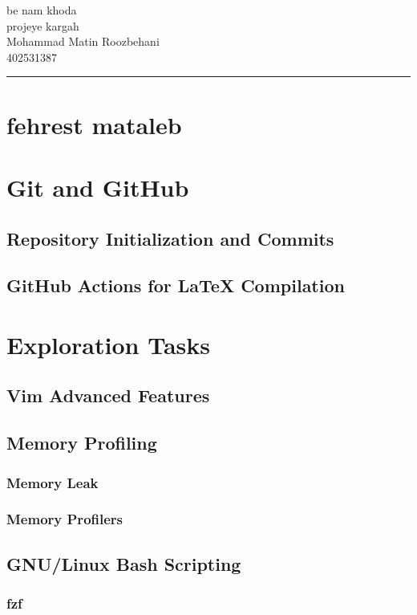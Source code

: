\documentclass{article}
\begin{document}
\begin{center}
    {\Huge be nam khoda} \\[1cm]
    {\LARGE projeye kargah} \\[0.5cm]
    {\large Mohammad Matin Roozbehani} \\[0.5cm]
    {\large 402531387} \\[1cm]
    \hrule
\end{center}

\vspace{1cm}

\section*{fehrest mataleb}

\section{Git and GitHub}
\subsection{Repository Initialization and Commits}
\subsection{GitHub Actions for LaTeX Compilation}

\section{Exploration Tasks}
\subsection{Vim Advanced Features}
\subsection{Memory Profiling}
\subsubsection{Memory Leak}
\subsubsection{Memory Profilers}
\subsection{GNU/Linux Bash Scripting}
\subsubsection{fzf}
\end{document}

